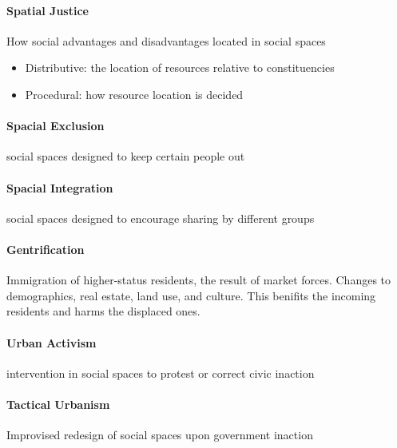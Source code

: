 \documentclass{article}
\begin{document}
\paragraph{Spatial Justice}
\label{par:spatial_justice}
How social advantages and disadvantages located in social spaces
\begin{itemize}
	\item Distributive: the location of resources relative to constituencies
	\item Procedural: how resource location is decided
\end{itemize}

\paragraph{Spacial Exclusion}
\label{par:spacial_exclusion}
social spaces designed to keep certain people out

\paragraph{Spacial Integration}
\label{par:spacial_integration}
social spaces designed to encourage sharing by different groups

\paragraph{Gentrification}
\label{par:gentrification}
Immigration of higher-status residents, the result of market forces. Changes to demographics, real estate, land use, and culture. This benifits the incoming residents and harms the displaced ones.

\paragraph{Urban Activism}
\label{par:urban_activism}
intervention in social spaces to protest or correct civic inaction

\paragraph{Tactical Urbanism}
\label{par:tactical_urbanism}
Improvised redesign of social spaces upon government inaction
\end{document}
